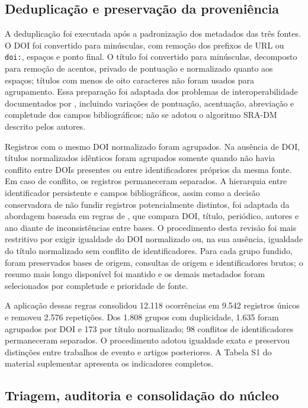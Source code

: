 \subsection{Deduplicação e preservação da proveniência}

A deduplicação foi executada após a padronização dos metadados das três fontes. O DOI foi convertido para minúsculas, com remoção dos prefixos de URL ou \texttt{doi:}, espaços e ponto final. O título foi convertido para minúsculas, decomposto para remoção de acentos, privado de pontuação e normalizado quanto aos espaços; títulos com menos de oito caracteres não foram usados para agrupamento. Essa preparação foi adaptada dos problemas de interoperabilidade documentados por \textcite{rathbone_deduplicacao_2015}, incluindo variações de pontuação, acentuação, abreviação e completude dos campos bibliográficos; não se adotou o algoritmo SRA-DM descrito pelos autores.

Registros com o mesmo DOI normalizado foram agrupados. Na ausência de DOI, títulos normalizados idênticos foram agrupados somente quando não havia conflito entre DOIs presentes ou entre identificadores próprios da mesma fonte. Em caso de conflito, os registros permaneceram separados. A hierarquia entre identificador persistente e campos bibliográficos, assim como a decisão conservadora de não fundir registros potencialmente distintos, foi adaptada da abordagem baseada em regras de \textcite{jiang_deduplicacao_regras_2014}, que compara DOI, título, periódico, autores e ano diante de inconsistências entre bases. O procedimento desta revisão foi mais restritivo por exigir igualdade do DOI normalizado ou, na sua ausência, igualdade do título normalizado sem conflito de identificadores. Para cada grupo fundido, foram preservados bases de origem, consultas de origem e identificadores brutos; o resumo mais longo disponível foi mantido e os demais metadados foram selecionados por completude e prioridade de fonte.

A aplicação dessas regras consolidou 12.118 ocorrências em 9.542 registros únicos e removeu 2.576 repetições. Dos 1.808 grupos com duplicidade, 1.635 foram agrupados por DOI e 173 por título normalizado; 98 conflitos de identificadores permaneceram separados. O procedimento adotou igualdade exata e preservou distinções entre trabalhos de evento e artigos posteriores. A Tabela S1 do material suplementar apresenta os indicadores completos.

\subsection{Triagem, auditoria e consolidação do núcleo}

